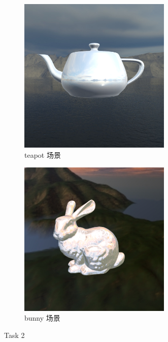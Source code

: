 \documentclass[UTF8]{ctexart}
\begin{document}
\begin{figure}[htbp]
    \begin{subfigure}[b]{0.49\textwidth}
        \centering
        \includegraphics[width=0.8\textwidth]{images/2-1.png}
        \caption{teapot 场景}
    \end{subfigure}
    \hfill
    \begin{subfigure}[b]{0.49\textwidth}
        \centering
        \includegraphics[width=0.8\textwidth]{images/2-2.png}
        \caption{bunny 场景}
    \end{subfigure}
    \caption*{Task 2}
\end{figure}
\end{document}
